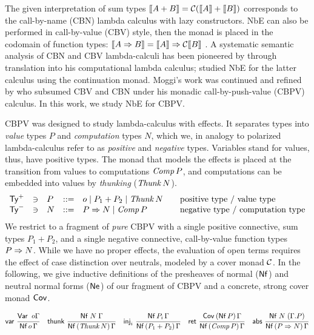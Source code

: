 \documentclass[a4paper]{easychair}
\renewcommand{\patom}{\ensuremath{o}}
\begin{document}
The given interpretation of sum types
$\mathopen{{[\kern-0.14em[}} A + B \mathclose{{]\kern-0.14em]}} = \mathcal{C}(\mathopen{{[\kern-0.14em[}} A \mathclose{{]\kern-0.14em]}} + \mathopen{{[\kern-0.14em[}} B \mathclose{{]\kern-0.14em]}})$ corresponds to the call-by-name
(CBN) lambda calculus with lazy constructors.  NbE can also be
performed in call-by-value (CBV) style, then the monad is placed in
the codomain of function types: $\mathopen{{[\kern-0.14em[}} A \Rightarrow B \mathclose{{]\kern-0.14em]}} = \mathopen{{[\kern-0.14em[}} A \mathclose{{]\kern-0.14em]}} \Rightarrow \mathcal{C} \mathopen{{[\kern-0.14em[}} B \mathclose{{]\kern-0.14em]}}$
\citep{danvy:popl96}.  A systematic semantic analysis of CBN and CBV
lambda-calculi has been pioneered by \citet{moggi:infcomp91} through
translation into his computational lambda calculus;
\citet{filinski:tlca01} studied NbE for the latter calculus using the
continuation monad.  Moggi's work was continued and refined
by \citet{levy:hosc06} who subsumed CBV and CBN under his monadic
call-by-push-value (CBPV) calculus.  In this work, we study NbE for CBPV.

CBPV was designed to study lambda-calculus with effects.  It separates
types into \emph{value} types $P$ and \emph{computation} types $N$, which we, in
analogy to polarized lambda-calculus
\citep{zeilberger:PhD,brockNannestadSchuermann:lpar10,espiritoSanto:entcs17}
refer to as \emph{positive} and \emph{negative} types.
Variables stand for values, thus, have positive types.
The monad that models the effects is placed at the transition from values
to computations $\mathit{Comp}\,P$, and computations can be embedded into
values by \emph{thunking} ($\mathit{Thunk}\,N$).
\[
\begin{array}{lllrl@{\qquad}l}
  \PTy & \ni & P & ::= & \patom
    \mid P_1 + P_2
    \mid \Thunk N
  & \mbox{positive type / value type}
\\
  \NTy & \ni & N & ::= & %
    P \To N
    \mid \Comp P
  & \mbox{negative type / computation type}
\\
\end{array}
\]
We restrict to a fragment of \emph{pure} CBPV
with a single positive connective, sum
types $P_1 + P_2$, and a single negative connective, call-by-value
function types $P \Rightarrow N$.  While we have no proper effects, the
evaluation of open terms requires the effect of case distinction over
neutrals, modeled by a cover monad $\mathcal{C}$.  In the following, we give
inductive definitions of the presheaves of
normal ($\mathsf{Nf}$) and neutral normal forms
($\mathsf{Ne}^{}$) of our fragment of CBPV and a concrete, strong cover monad $\mathsf{Cov}^{}$.
\begin{small}
\begin{gather*}
  \nru{\tvar}{\Var \patom \Gamma}{\PValNf {\patom} \Gamma}
\quad
  \nru{\tthunk}{\Nf N \Gamma}{\PValNfP{\Thunk N}\Gamma}
\quad
  \nru{\tinj_i}{\PValNf{P_i}\Gamma}{\PValNfP{P_1 + P_2}\Gamma}
\quad
  \nru{\tret}
      {\CoverP {\tVNf\,P}  \Gamma}
      {\NfP {\Comp P} \Gamma}
\quad
  \nru{\tabs}
      {\Nf N {(\cext \Gamma P)}}
      {\NfP {P \To N} \Gamma}
\end{gather*}
\end{small}
\end{document}
